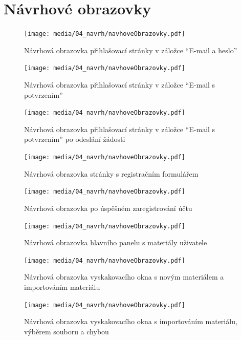 \chapter{Návrhové obrazovky}\label{appendix:navrhoveObrazovky}



\begin{figure}[ht!]
    \centering
    \texttt{[image: media/04\_navrh/navhoveObrazovky.pdf]}
    \caption{Návrhová obrazovka přihlašovací stránky v záložce \enquote{E-mail a heslo}}
\end{figure}

\begin{figure}[ht!]
    \centering
    \texttt{[image: media/04\_navrh/navhoveObrazovky.pdf]}
    \caption{Návrhová obrazovka přihlašovací stránky v záložce \enquote{E-mail s potvrzením}}
\end{figure}

\begin{figure}[ht!]
    \centering
    \texttt{[image: media/04\_navrh/navhoveObrazovky.pdf]}
    \caption{Návrhová obrazovka přihlašovací stránky v záložce \enquote{E-mail s potvrzením} po odeslání žádosti}
\end{figure}



\begin{figure}[ht!]
    \centering
    \texttt{[image: media/04\_navrh/navhoveObrazovky.pdf]}
    \caption{Návrhová obrazovka stránky s registračním formulářem}
\end{figure}

\begin{figure}[ht!]
    \centering
    \texttt{[image: media/04\_navrh/navhoveObrazovky.pdf]}
    \caption{Návrhová obrazovka po úspěšném zaregistrování účtu}
\end{figure}

\begin{figure}[ht!]
    \centering
    \texttt{[image: media/04\_navrh/navhoveObrazovky.pdf]}
    \caption{Návrhová obrazovka hlavního panelu s materiály uživatele}
\end{figure}

\begin{figure}[ht!]
    \centering
    \texttt{[image: media/04\_navrh/navhoveObrazovky.pdf]}
    \caption{Návrhová obrazovka vyskakovacího okna s novým materiálem a importováním materiálu}
\end{figure}

\begin{figure}[ht!]
    \centering
    \texttt{[image: media/04\_navrh/navhoveObrazovky.pdf]}
    \caption{Návrhová obrazovka vyskakovacího okna s importováním materiálu, výběrem souboru a chybou}
\end{figure}


